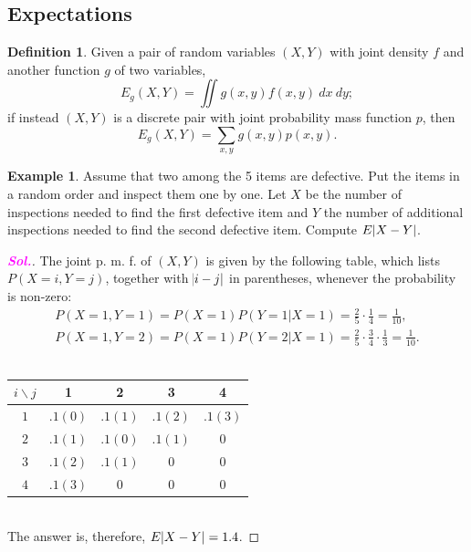 \documentclass[12pt,a4paper]{article}
\theoremstyle{definition}
\newtheorem{example}{Example}[section]
\theoremstyle{definition}
\newtheorem*{definition}{Definition}
\theoremstyle{definition}
\theoremstyle{definition}
\theoremstyle{remark}
\theoremstyle{definition}
\newcommand{\sol}{\textcolor{magenta}{\bf \textit{Sol.}}\quad}
\begin{document}
\subsection{Expectations}
\begin{tcolorbox}[colback=white]
	\begin{definition}
	Given a pair of random variables $(X,Y)$ with joint density $f$ and another function $g$ of two variables, \[
	E_g(X,Y)=\iint g(x,y)f(x,y)\ dx\ dy;
	\] if instead $(X,Y)$ is a discrete pair with joint probability mass function $p$, then \[
	E_g(X,Y)=\sum_{x,y}g(x,y)p(x,y).
	\]
	\end{definition}
\end{tcolorbox}
\begin{example}
	Assume that two among the 5 items are defective. Put the items in a random order and inspect them one by one. Let $X$ be the number of inspections needed to find the first defective item and $Y$ the number of additional inspections needed to find the second defective item. Compute $E\abs{X-Y}$.\begin{proof}[\sol]
		The joint p. m. f. of $(X,Y)$ is given by the following table, which lists $P(X=i, Y=j)$, together with $\abs{i-j}$ in parentheses, whenever the probability is non-zero: \begin{align*}
		P(X=1,Y=1)=P(X=1)P(Y=1|X=1)=\frac{2}{5}\cdot\frac{1}{4}=\frac{1}{10},\\
		P(X=1,Y=2)=P(X=1)P(Y=2|X=1)=\frac{2}{5}\cdot\frac{3}{4}\cdot\frac{1}{3}=\frac{1}{10}.
		\end{align*}\ \begin{center}
			\begin{tabular}{c|c|c|c|c}
				\toprule[1.5pt]
				$i\backslash j$ & 1 & 2 & 3 & 4\\
				\midrule
				$1$ & $.1 (0)$ & $.1 (1)$ & $.1 (2)$ & $.1 (3)$\\
				\hline
				$2$ & $.1 (1)$ & $.1 (0)$ & $.1 (1)$ & $0$\\
				\hline
				$3$ & $.1 (2)$ & $.1 (1)$ & $0$ & $0$\\
				\hline
				$4$ & $.1 (3)$ & $0$ & $0$ & $0$\\
				\bottomrule[1.5pt]
			\end{tabular}
		\end{center}\ \\ The answer is, therefore, $E\abs{X-Y}=1.4$.
	\end{proof}
\end{example}
\
\end{document}
